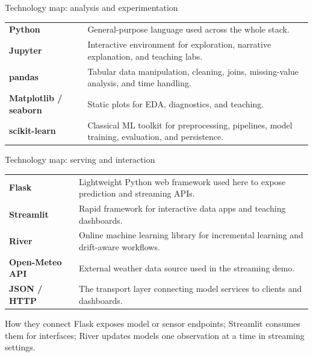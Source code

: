 \begin{frame}{Technology map: analysis and experimentation}
\begin{tabularx}{\textwidth}{>{\bfseries}l X}
Python & General-purpose language used across the whole stack. \\
Jupyter & Interactive environment for exploration, narrative explanation, and teaching labs. \\
pandas & Tabular data manipulation, cleaning, joins, missing-value analysis, and time handling. \\
Matplotlib / seaborn & Static plots for EDA, diagnostics, and teaching. \\
scikit-learn & Classical ML toolkit for preprocessing, pipelines, model training, evaluation, and persistence. \\
\end{tabularx}
\coursefooter
\end{frame}

\begin{frame}{Technology map: serving and interaction}
\begin{tabularx}{\textwidth}{>{\bfseries}l X}
Flask & Lightweight Python web framework used here to expose prediction and streaming APIs. \\
Streamlit & Rapid framework for interactive data apps and teaching dashboards. \\
River & Online machine learning library for incremental learning and drift-aware workflows. \\
Open-Meteo API & External weather data source used in the streaming demo. \\
JSON / HTTP & The transport layer connecting model services to clients and dashboards. \\
\end{tabularx}
\begin{block}{How they connect}
Flask exposes model or sensor endpoints; Streamlit consumes them for interfaces; River updates models one observation at a time in streaming settings.
\end{block}
\coursefooter
\end{frame}

